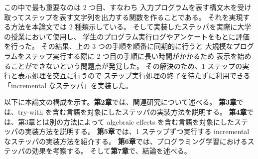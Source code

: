 この中で最も重要なのは 2 つ目、すなわち
入力プログラムを表す構文木を受け取ってステップを表す文字列を出力する関数を作ることである。
それを実現する方法を本論文では 2 種類示している。
そして実装したステッパを実際に大学の授業において使用し、
学生のプログラム実行ログやアンケートをもとに評価を行った。
その結果、上の 3 つの手順を順番に同期的に行うと
大規模なプログラムをステップ実行する際に 2 つ目の手順に長い時間がかかるため
表示を始めることができないという問題点が発覚した。
その解決のため、1 ステップの実行と表示処理を交互に行うので
ステップ実行処理の終了を待たずに利用できる「incremental なステッパ」を実装した。

\vspace{1cm}
以下に本論文の構成を示す。{\bf 第2章}では、関連研究について述べる。
{\bf 第3章}では、try-with を含む言語を対象にしたステッパの実装方法を説明する。
{\bf 第4章}では、第3章とは別の方法によって algebraic effects
を含む言語を対象にしたステッパの実装方法を説明する。
{\bf 第5章}では、1 ステップずつ実行する incremental なステッパの実装方法を紹介する。
{\bf 第6章}では、プログラミング学習におけるステッパの効果を考察する。
そして{\bf 第7章}で、結論を述べる。
